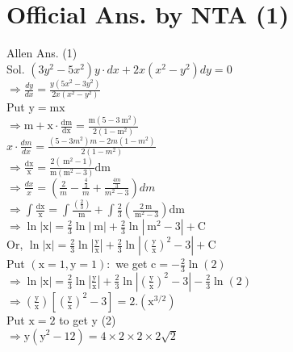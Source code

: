 \documentclass[10pt]{article}
\begin{document}
\section*{Official Ans. by NTA (1)}
Allen Ans. (1)\\
Sol. \(\left(3 y^{2}-5 x^{2}\right) y \cdot d x+2 x\left(x^{2}-y^{2}\right) d y=0\)\\
\(\Rightarrow \frac{d y}{d x}=\frac{y\left(5 x^{2}-3 y^{2}\right)}{2 x\left(x^{2}-y^{2}\right)}\)\\
Put \(\mathrm{y}=\mathrm{mx}\)\\
\(\Rightarrow \mathrm{m}+\mathrm{x} \cdot \frac{\mathrm{dm}}{\mathrm{dx}}=\frac{\mathrm{m}\left(5-3 \mathrm{~m}^{2}\right)}{2\left(1-\mathrm{m}^{2}\right)}\)\\
\(x \cdot \frac{d m}{d x}=\frac{\left(5-3 m^{2}\right) m-2 m\left(1-m^{2}\right)}{2\left(1-m^{2}\right)}\)\\
\(\Rightarrow \frac{\mathrm{dx}}{\mathrm{x}}=\frac{2\left(\mathrm{~m}^{2}-1\right)}{\mathrm{m}\left(\mathrm{m}^{2}-3\right)} \mathrm{dm}\)\\
\(\Rightarrow \frac{d x}{x}=\left(\frac{2}{m}-\frac{\frac{4}{3}}{m}+\frac{\frac{4 m}{3}}{m^{2}-3}\right) d m\)\\
\(\Rightarrow \int \frac{\mathrm{dx}}{\mathrm{x}}=\int \frac{\left(\frac{2}{3}\right)}{\mathrm{m}}+\int \frac{2}{3}\left(\frac{2 \mathrm{~m}}{\mathrm{~m}^{2}-3}\right) \mathrm{dm}\)\\
\(\Rightarrow \ln |\mathrm{x}|=\frac{2}{3} \ln |\mathrm{~m}|+\frac{2}{3} \ln \left|\mathrm{~m}^{2}-3\right|+\mathrm{C}\)\\
Or, \(\ln |\mathrm{x}|=\frac{2}{3} \ln \left|\frac{\mathrm{y}}{\mathrm{x}}\right|+\frac{2}{3} \ln \left|\left(\frac{\mathrm{y}}{\mathrm{x}}\right)^{2}-3\right|+\mathrm{C}\)\\
Put \((\mathrm{x}=1, \mathrm{y}=1):\) we get \(\mathrm{c}=-\frac{2}{3} \ln (2)\)\\
\(\Rightarrow \ln |\mathrm{x}|=\frac{2}{3} \ln \left|\frac{\mathrm{y}}{\mathrm{x}}\right|+\frac{2}{3} \ln \left|\left(\frac{\mathrm{y}}{\mathrm{x}}\right)^{2}-3\right|-\frac{2}{3} \ln (2)\)\\
\(\Rightarrow\left(\frac{\mathrm{y}}{\mathrm{x}}\right)\left[\left(\frac{\mathrm{y}}{\mathrm{x}}\right)^{2}-3\right]=2 .\left(\mathrm{x}^{3 / 2}\right)\)\\
Put \(\mathrm{x}=2\) to get y (2)\\
\(\Rightarrow \mathrm{y}\left(\mathrm{y}^{2}-12\right)=4 \times 2 \times 2 \times 2 \sqrt{2}\)\\
\end{document}
